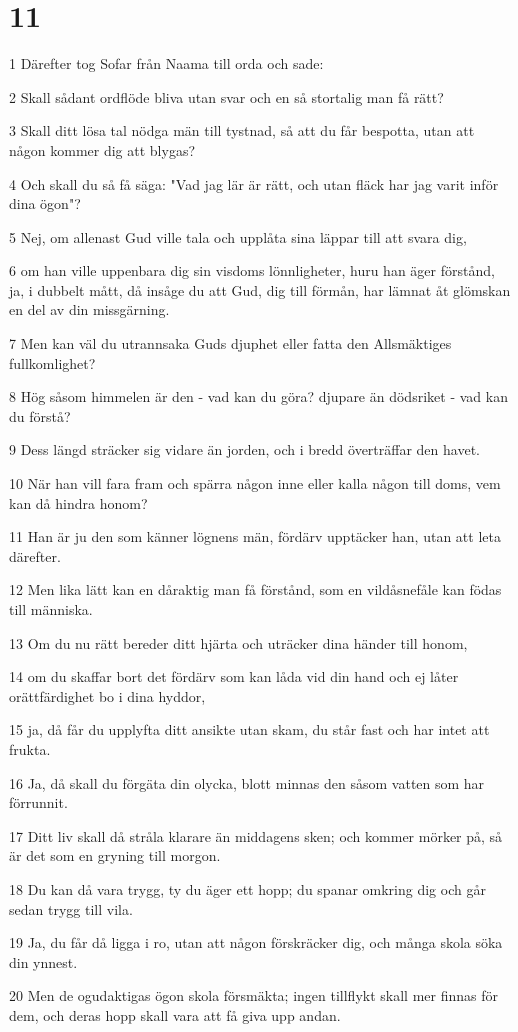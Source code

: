 \chapter{11}

\par 1 Därefter tog Sofar från Naama till orda och sade:
\par 2 Skall sådant ordflöde bliva utan svar och en så stortalig man få rätt?
\par 3 Skall ditt lösa tal nödga män till tystnad, så att du får bespotta, utan att någon kommer dig att blygas?
\par 4 Och skall du så få säga: "Vad jag lär är rätt, och utan fläck har jag varit inför dina ögon"?
\par 5 Nej, om allenast Gud ville tala och upplåta sina läppar till att svara dig,
\par 6 om han ville uppenbara dig sin visdoms lönnligheter, huru han äger förstånd, ja, i dubbelt mått, då insåge du att Gud, dig till förmån, har lämnat åt glömskan en del av din missgärning.
\par 7 Men kan väl du utrannsaka Guds djuphet eller fatta den Allsmäktiges fullkomlighet?
\par 8 Hög såsom himmelen är den - vad kan du göra? djupare än dödsriket - vad kan du förstå?
\par 9 Dess längd sträcker sig vidare än jorden, och i bredd överträffar den havet.
\par 10 När han vill fara fram och spärra någon inne eller kalla någon till doms, vem kan då hindra honom?
\par 11 Han är ju den som känner lögnens män, fördärv upptäcker han, utan att leta därefter.
\par 12 Men lika lätt kan en dåraktig man få förstånd, som en vildåsnefåle kan födas till människa.
\par 13 Om du nu rätt bereder ditt hjärta och uträcker dina händer till honom,
\par 14 om du skaffar bort det fördärv som kan låda vid din hand och ej låter orättfärdighet bo i dina hyddor,
\par 15 ja, då får du upplyfta ditt ansikte utan skam, du står fast och har intet att frukta.
\par 16 Ja, då skall du förgäta din olycka, blott minnas den såsom vatten som har förrunnit.
\par 17 Ditt liv skall då stråla klarare än middagens sken; och kommer mörker på, så är det som en gryning till morgon.
\par 18 Du kan då vara trygg, ty du äger ett hopp; du spanar omkring dig och går sedan trygg till vila.
\par 19 Ja, du får då ligga i ro, utan att någon förskräcker dig, och många skola söka din ynnest.
\par 20 Men de ogudaktigas ögon skola försmäkta; ingen tillflykt skall mer finnas för dem, och deras hopp skall vara att få giva upp andan.

